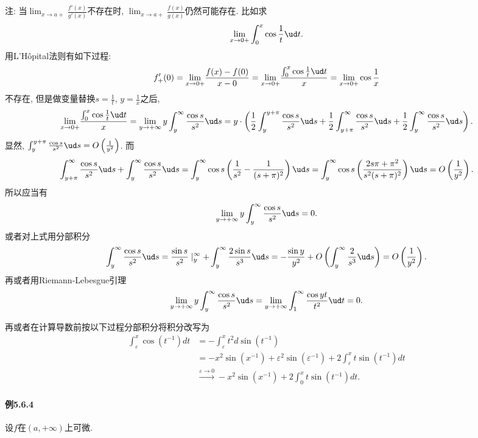 注: 当$\lim_{x\to a+}\frac{f'(x)}{g'(x)}$不存在时, $\lim_{x\to a+}\frac{f(x)}{g(x)}$仍然可能存在.
比如求
\[
\lim_{x\to0+}\int_{0}^{x}\cos\frac{1}{t}\ud t.
\]
用L'H\^{o}pital法则有如下过程:
\[
f'_{+}(0)=\underset{x\to0+}{\mathop{\lim}}\frac{f(x)-f(0)}{x-0}=\underset{x\to0+}{\mathop{\lim}}\frac{\int_{0}^{x}\cos\frac{1}{t}\ud t}{x}=\underset{x\to0+}{\mathop{\lim}}\cos\frac{1}{x}
\]
不存在, 但是做变量替换$s=\frac{1}{t}$, $y=\frac{1}{x}$之后, 
\[
\underset{x\to0+}{\mathop{\lim}}\frac{\int_{0}^{x}\cos\frac{1}{t}\ud t}{x}=\lim_{y\to+\infty}y\int_{y}^{\infty}\frac{\cos s}{s^{2}}\ud s=y\cdot\left(\frac{1}{2}\int_{y}^{y+\pi}\frac{\cos s}{s^{2}}\ud s+\frac{1}{2}\int_{y+\pi}^{\infty}\frac{\cos s}{s^{2}}\ud s+\frac{1}{2}\int_{y}^{\infty}\frac{\cos s}{s^{2}}\ud s\right).
\]
显然, $\int_{y}^{y+\pi}\frac{\cos s}{s^{2}}\ud s=O\left(\frac{1}{y^{2}}\right)$.
而
\[
\int_{y+\pi}^{\infty}\frac{\cos s}{s^{2}}\ud s+\int_{y}^{\infty}\frac{\cos s}{s^{2}}\ud s=\int_{y}^{\infty}\cos s\left(\frac{1}{s^{2}}-\frac{1}{(s+\pi)^{2}}\right)\ud s=\int_{y}^{\infty}\cos s\left(\frac{2s\pi+\pi^{2}}{s^{2}(s+\pi)^{2}}\right)\ud s=O\left(\frac{1}{y^{2}}\right).
\]
所以应当有
\[
\lim_{y\to+\infty}y\int_{y}^{\infty}\frac{\cos s}{s^{2}}\ud s=0.
\]
或者对上式用分部积分
\[
\int_{y}^{\infty}\frac{\cos s}{s^{2}}\ud s=\frac{\sin s}{s^{2}}\mid_{y}^{\infty}+\int_{y}^{\infty}\frac{2\sin s}{s^{3}}\ud s=-\frac{\sin y}{y^{2}}+O\left(\int_{y}^{\infty}\frac{2}{s^{3}}\ud s\right)=O\left(\frac{1}{y^{2}}\right).
\]
再或者用Riemann-Lebesgue引理
\[
\lim_{y\to+\infty}y\int_{y}^{\infty}\frac{\cos s}{s^{2}}\ud s=\lim_{y\to+\infty}\int_{1}^{\infty}\frac{\cos yt}{t^{2}}\ud t=0.
\]

再或者在计算导数前按以下过程分部积分将积分改写为
\[
\begin{aligned}\int_{\varepsilon}^{x}\cos\left(t^{-1}\right)dt & =-\int_{\varepsilon}^{x}t^{2}d\sin\left(t^{-1}\right)\\
 & =-x^{2}\sin\left(x^{-1}\right)+\varepsilon^{2}\sin\left(\varepsilon^{-1}\right)+2\int_{\varepsilon}^{x}t\sin\left(t^{-1}\right)dt\\
 & \stackrel{\varepsilon\rightarrow0}{\longrightarrow}-x^{2}\sin\left(x^{-1}\right)+2\int_{0}^{x}t\sin\left(t^{-1}\right)dt.
\end{aligned}
\]


\paragraph{例5.6.4}

设$f$在$(a,+\infty)$上可微.

